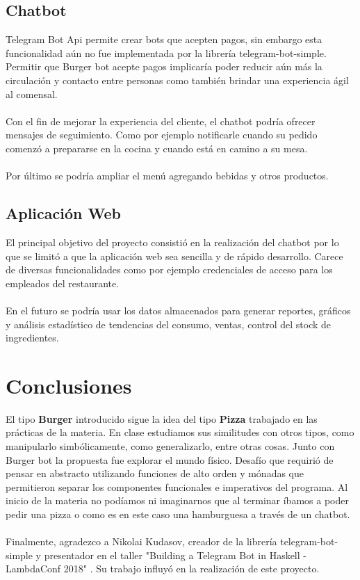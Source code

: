 \documentclass[a4paper,12pt]{article}
\begin{document}
\subsection{Chatbot}

Telegram Bot Api permite crear bots que acepten pagos, sin embargo esta funcionalidad aún no fue implementada por la librería telegram-bot-simple. Permitir que Burger bot acepte pagos implicaría poder reducir aún más la circulación y contacto entre personas como también brindar una experiencia ágil al comensal.
\\\\
Con el fin de mejorar la experiencia del cliente, el chatbot podría ofrecer mensajes de seguimiento. Como por ejemplo notificarle cuando su pedido comenzó a prepararse en la cocina y cuando está en camino a su mesa.
\\\\
Por último se podría ampliar el menú agregando bebidas y otros productos.

\subsection{Aplicación Web}

El principal objetivo del proyecto consistió en la realización del chatbot por lo que se limitó a que la aplicación web sea sencilla y de rápido desarrollo. Carece de diversas funcionalidades como por ejemplo credenciales de acceso para los empleados del restaurante.
\\\\
En el futuro se podría usar los datos almacenados para generar reportes, gráficos y análisis estadístico de tendencias del consumo, ventas, control del stock de ingredientes.

\section{Conclusiones}

El tipo \textbf{Burger} introducido sigue la idea del tipo \textbf{Pizza} trabajado en las prácticas de la materia. En clase estudiamos sus similitudes con otros tipos, como manipularlo simbólicamente, como generalizarlo, entre otras cosas. Junto con Burger bot la propuesta fue explorar el mundo físico. Desafío que requirió de pensar en abstracto utilizando funciones de alto orden y mónadas que permitieron separar los componentes funcionales e imperativos del programa. 
Al inicio de la materia no podíamos ni imaginarnos que al terminar íbamos a poder pedir una pizza o como es en este caso una hamburguesa a través de un chatbot.
\\\\
Finalmente, agradezco a Nikolai Kudasov, creador de la librería telegram-bot-simple y presentador en el taller "Building a Telegram Bot in Haskell - LambdaConf 2018" \cite{lambda-conf-1}\cite{lambda-conf-2}. Su trabajo influyó en la realización de este proyecto.

\pagebreak
%
\nocite{postgres-simple-tutorial}
\nocite{postgresql-simple-examples}
\nocite{fizruk-telegram-bot-simple}
\nocite{spock-tutorial}
\nocite{blaze-html-tutorial}


\end{document}
